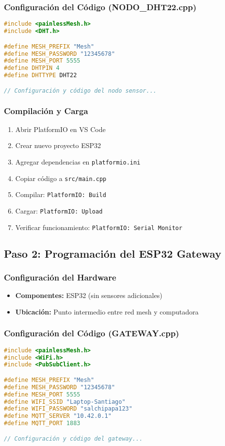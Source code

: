 \documentclass[12pt]{article}
\begin{document}
\subsubsection{Configuración del Código (NODO\_DHT22.cpp)}
\begin{lstlisting}[language=C++, basicstyle=\small\ttfamily]
#include <painlessMesh.h>
#include <DHT.h>

#define MESH_PREFIX "Mesh"
#define MESH_PASSWORD "12345678"
#define MESH_PORT 5555
#define DHTPIN 4
#define DHTTYPE DHT22

// Configuración y código del nodo sensor...
\end{lstlisting}

\subsubsection{Compilación y Carga}
\begin{enumerate}
    \item Abrir PlatformIO en VS Code
    \item Crear nuevo proyecto ESP32
    \item Agregar dependencias en \texttt{platformio.ini}
    \item Copiar código a \texttt{src/main.cpp}
    \item Compilar: \texttt{PlatformIO: Build}
    \item Cargar: \texttt{PlatformIO: Upload}
    \item Verificar funcionamiento: \texttt{PlatformIO: Serial Monitor}
\end{enumerate}

\subsection{Paso 2: Programación del ESP32 Gateway}

\subsubsection{Configuración del Hardware}
\begin{itemize}
    \item \textbf{Componentes:} ESP32 (sin sensores adicionales)
    \item \textbf{Ubicación:} Punto intermedio entre red mesh y computadora
\end{itemize}

\subsubsection{Configuración del Código (GATEWAY.cpp)}
\begin{lstlisting}[language=C++, basicstyle=\small\ttfamily]
#include <painlessMesh.h>
#include <WiFi.h>
#include <PubSubClient.h>

#define MESH_PREFIX "Mesh"
#define MESH_PASSWORD "12345678"
#define MESH_PORT 5555
#define WIFI_SSID "Laptop-Santiago"
#define WIFI_PASSWORD "salchipapa123"
#define MQTT_SERVER "10.42.0.1"
#define MQTT_PORT 1883

// Configuración y código del gateway...
\end{lstlisting}
\end{document}
